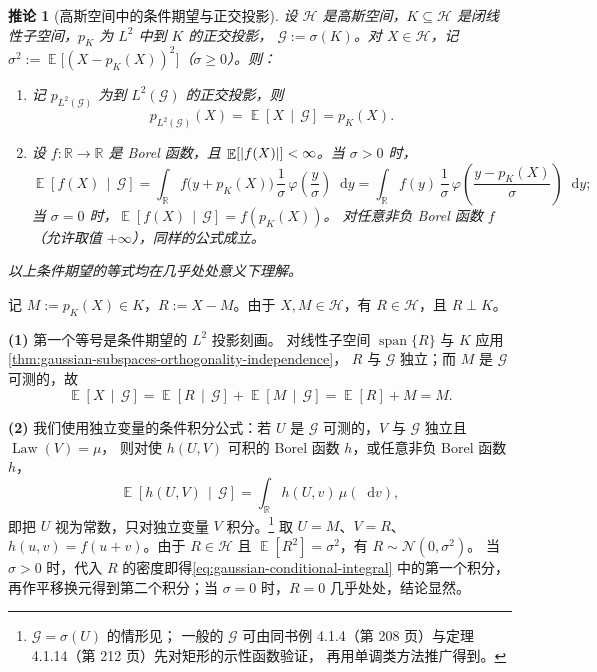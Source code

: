 \documentclass[UTF8,11pt,a4paper,oneside,fontset=fandol]{ctexrep}
\makeatletter
\numberwithin{equation}{section}
\theoremstyle{zhthm}
\newtheorem{corollary}[theorem]{推论}
\renewenvironment{proof}[1][\proofname]{\par
  \pushQED{\qed}%
  \normalfont\topsep6\p@\@plus6\p@\relax
  \trivlist
  \item[\hskip\labelsep\bfseries#1\hspace{0.5em}]\ignorespaces
}{%
  \popQED\endtrivlist\@endpefalse
}
\renewcommand{\proofname}{证明}
\newcommand{\R}{\mathbb{R}}
\newcommand{\G}{\mathcal{G}}
\newcommand{\Hcal}{\mathcal{H}}
\DeclareMathOperator{\E}{\mathbb{E}}
\DeclareMathOperator{\Law}{Law}
\DeclareMathOperator{\Span}{span}
\newcommand{\Normal}{\mathcal{N}}
\newcommand{\dd}{\mathop{}\!\mathrm{d}}
\newcommand{\Econd}[2]{%
  \E\!\left[#1\,\middle|\,#2\right]}
\DeclarePairedDelimiter{\abs}{\lvert}{\rvert}
\makeatother
\begin{document}
\begin{corollary}[高斯空间中的条件期望与正交投影]
\label{cor:gaussian-conditional-projection}
设 $\Hcal$ 是高斯空间，$K\subseteq\Hcal$ 是闭线性子空间，$p_K$ 为 $L^2$ 中到 $K$ 的正交投影，
$\G:=\sigma(K)$。对 $X\in\Hcal$，记 $\sigma^2:=\E\bigl[(X-p_K(X))^2\bigr]$（$\sigma\ge0$）。则：
\begin{enumerate}
  \item 记 $p_{L^2(\G)}$ 为到 $L^2(\G)$ 的正交投影，则
    \begin{equation}
      \label{eq:gaussian-conditional-projection}
      p_{L^2(\G)}(X)=\Econd{X}{\G}=p_K(X).
    \end{equation}
  \item 设 $f:\R\to\R$ 是 Borel 函数，且 $\E[\abs{f(X)}]<\infty$。当 $\sigma>0$ 时，
    \begin{equation}
      \label{eq:gaussian-conditional-integral}
      \Econd{f(X)}{\G}
      =\int_{\R}f\bigl(y+p_K(X)\bigr)\,\frac1\sigma\,\varphi\!\left(\frac y\sigma\right)\dd y
      =\int_{\R}f(y)\,\frac1\sigma\,\varphi\!\left(\frac{y-p_K(X)}{\sigma}\right)\dd y;
    \end{equation}
    当 $\sigma=0$ 时，$\Econd{f(X)}{\G}=f(p_K(X))$。
    对任意非负 Borel 函数 $f$（允许取值 $+\infty$），同样的公式成立。
\end{enumerate}
以上条件期望的等式均在几乎处处意义下理解。
\end{corollary}

\begin{proof}
记 $M:=p_K(X)\in K$，$R:=X-M$。由于 $X,M\in\Hcal$，有 $R\in\Hcal$，且 $R\perp K$。

\textbf{(1)} 第一个等号是条件期望的 $L^2$ 投影刻画\cite[定理 4.1.15，第 213 页]{Durrett2019}。
对线性子空间 $\Span\{R\}$ 与 $K$ 应用\cref{thm:gaussian-subspaces-orthogonality-independence}，
$R$ 与 $\G$ 独立；而 $M$ 是 $\G$ 可测的，故
\[
  \Econd{X}{\G}=\Econd{R}{\G}+\Econd{M}{\G}=\E[R]+M=M.
\]

\textbf{(2)} 我们使用独立变量的条件积分公式：若 $U$ 是 $\G$ 可测的，$V$ 与 $\G$ 独立且 $\Law(V)=\mu$，
则对使 $h(U,V)$ 可积的 Borel 函数 $h$，或任意非负 Borel 函数 $h$，
\[
  \Econd{h(U,V)}{\G}=\int_{\R}h(U,v)\,\mu(\dd v),
\]
即把 $U$ 视为常数，只对独立变量 $V$ 积分。\footnote{%
  $\G=\sigma(U)$ 的情形见\cite[例 4.1.7，第 209--210 页]{Durrett2019}；
  一般的 $\G$ 可由同书例 4.1.4（第 208 页）与定理 4.1.14（第 212 页）先对矩形的示性函数验证，
  再用单调类方法推广得到。}
取 $U=M$、$V=R$、$h(u,v)=f(u+v)$。由于 $R\in\Hcal$ 且 $\E[R^2]=\sigma^2$，有 $R\sim\Normal(0,\sigma^2)$。
当 $\sigma>0$ 时，代入 $R$ 的密度即得\cref{eq:gaussian-conditional-integral} 中的第一个积分，
再作平移换元得到第二个积分；当 $\sigma=0$ 时，$R=0$ 几乎处处，结论显然。
\end{proof}
\end{document}
